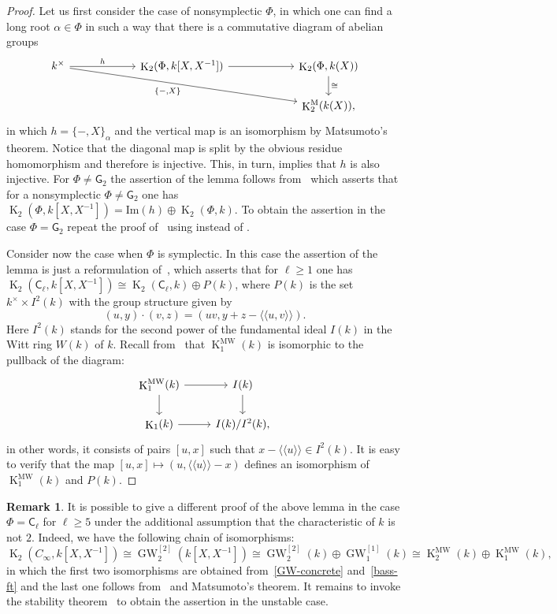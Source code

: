\documentclass[oneside, 8pt]{amsart}
\theoremstyle{remark}
\theoremstyle{definition}
\numberwithin{lemma}{section}
\numberwithin{prop}{section}
\numberwithin{corollary}{section}
\numberwithin{externaltheorem}{section}
\newtheorem{rem}[lemma]{Remark}
\DeclareMathOperator{\K}{K}
\DeclareMathOperator{\GW}{GW}
\newcommand{\inv}{^{-1}}
\newcommand{\rC}{\mathsf{C}}
\newcommand{\rG}{\mathsf{G}}
\numberwithin{equation}{section}
\begin{document}
\begin{proof} Let us first consider the case of nonsymplectic $\Phi$, in which one can find a long root $\alpha\in \Phi$ in such a way that there is a commutative diagram of abelian groups
\[\begin{tikzcd}[column sep=5pc] k^\times \arrow{drr}[swap]{\{-, X\}} \arrow{r}{h}  & \K_2(\Phi, k[X, X^{-1}]) \arrow{r} & \K_2(\Phi, k(X)) \arrow{d}{\cong} \\
 & & \K_2^\mathrm{M}(k(X)), \end{tikzcd}\]
in which $h = \{ -, X \}_{\alpha}$ and the vertical map is an isomorphism by Matsumoto's theorem.
Notice that the diagonal map is split by the obvious residue homomorphism and therefore is injective. This, in turn, implies that $h$ is also injective.
For $\Phi \neq \rG_2$ the assertion of the lemma follows from~\cite[Satz~3]{Hur77} which asserts that for a nonsymplectic $\Phi\neq\rG_2$ one has $\K_2(\Phi, k[X, X\inv]) = \mathrm{Im}(h) \oplus \K_2(\Phi, k)$.
To obtain the assertion in the case $\Phi = \rG_2$ repeat the proof of~\cite[Satz~3]{Hur77} using \cite[Corollary~6]{AM88} instead of \cite[Korollar~4]{Hur77}.

Consider now the case when $\Phi$ is symplectic. In this case the assertion of the lemma is just a reformulation of~\cite[Theorem~B]{MR91},
which asserts that for $\ell \geq 1$ one has $\K_2(\rC_\ell, k[X, X\inv]) \cong \K_2(\rC_\ell, k) \oplus P(k)$, where
$P(k)$ is the set $k^\times \times I^2(k)$ with the group structure given by
\[ (u, y) \cdot (v, z) = (uv, y + z - \langle\langle u, v\rangle\rangle).\]
Here $I^2(k)$ stands for the second power of the fundamental ideal $I(k)$ in the Witt ring $W(k)$ of $k$.
Recall from~\cite{Mo04} that $\K_1^\mathrm{MW}(k)$ is isomorphic to the pullback of the diagram:
\[ \begin{tikzcd} \K_1^\mathrm{MW}(k) \arrow{r} \arrow{d} & I(k) \arrow{d} \\ \K_1(k) \arrow{r} & I(k)/I^2(k), \end{tikzcd} \]
in other words, it consists of pairs $[u, x]$ such that $x - \langle \langle u \rangle \rangle \in I^2(k)$.
It is easy to verify that the map $[u, x] \mapsto (u, \langle\langle u \rangle\rangle - x)$ defines an isomorphism of $\K_1^\mathrm{MW}(k)$ and $P(k)$. \end{proof}

\begin{rem} It is possible to give a different proof of the above lemma in the case $\Phi = \rC_\ell$ for $\ell \geq 5$ under the additional assumption that the characteristic of $k$ is not $2$. Indeed, we have the following chain of isomorphisms:
\begin{equation} \K_2(C_\infty, k[X, X^{-1}]) \cong \GW_2^{[2]}(k[X,X^{-1}]) \cong \GW_2^{[2]}(k) \oplus \GW_1^{[1]}(k) \cong \K_2^\mathrm{MW}(k) \oplus \K_1^\mathrm{MW}(k),\end{equation}
in which the first two isomorphisms are obtained from~\eqref{GW-concrete} and~\cref{bass-ft} and the last one follows from~\cite[Lemma~4.1.1]{AF17} and Matsumoto's theorem.
It remains to invoke the stability theorem~\cite[Theorem~9.4]{Pa89} to obtain the assertion in the unstable case. \end{rem}
\end{document}
